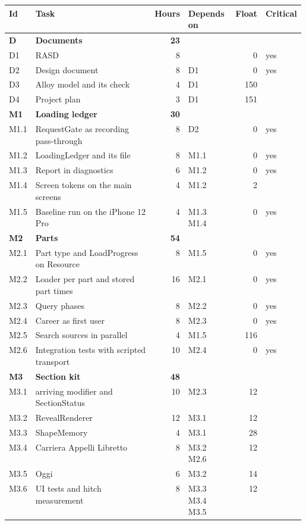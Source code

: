 \begin{longtable}{@{}l p{0.42\linewidth} r p{0.16\linewidth} r l@{}}
\toprule Id & Task & Hours & Depends on & Float & Critical \\
\endhead
\midrule \textbf{D} & \textbf{Documents} & \textbf{23} & & & \\
D1 & RASD & 8 &  & 0 & yes \\
D2 & Design document & 8 & D1 & 0 & yes \\
D3 & Alloy model and its check & 4 & D1 & 150 &  \\
D4 & Project plan & 3 & D1 & 151 &  \\
\midrule \textbf{M1} & \textbf{Loading ledger} & \textbf{30} & & & \\
M1.1 & RequestGate as recording pass-through & 8 & D2 & 0 & yes \\
M1.2 & LoadingLedger and its file & 8 & M1.1 & 0 & yes \\
M1.3 & Report in diagnostics & 6 & M1.2 & 0 & yes \\
M1.4 & Screen tokens on the main screens & 4 & M1.2 & 2 &  \\
M1.5 & Baseline run on the iPhone 12 Pro & 4 & M1.3 M1.4 & 0 & yes \\
\midrule \textbf{M2} & \textbf{Parts} & \textbf{54} & & & \\
M2.1 & Part type and LoadProgress on Resource & 8 & M1.5 & 0 & yes \\
M2.2 & Loader per part and stored part times & 16 & M2.1 & 0 & yes \\
M2.3 & Query phases & 8 & M2.2 & 0 & yes \\
M2.4 & Career as first user & 8 & M2.3 & 0 & yes \\
M2.5 & Search sources in parallel & 4 & M1.5 & 116 &  \\
M2.6 & Integration tests with scripted transport & 10 & M2.4 & 0 & yes \\
\midrule \textbf{M3} & \textbf{Section kit} & \textbf{48} & & & \\
M3.1 & arriving modifier and SectionStatus & 10 & M2.3 & 12 &  \\
M3.2 & RevealRenderer & 12 & M3.1 & 12 &  \\
M3.3 & ShapeMemory & 4 & M3.1 & 28 &  \\
M3.4 & Carriera Appelli Libretto & 8 & M3.2 M2.6 & 12 &  \\
M3.5 & Oggi & 6 & M3.2 & 14 &  \\
M3.6 & UI tests and hitch measurement & 8 & M3.3 M3.4 M3.5 & 12 &  \\

\end{longtable}
